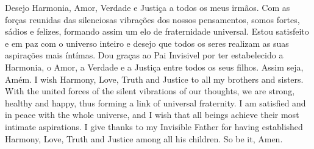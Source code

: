   \beginverse
    Desejo Harmonia, Amor, Verdade e Justiça a todos os
    meus irmãos. Com as forças reunidas das silenciosas
    vibrações dos nossos pensamentos, somos fortes,
    sádios e felizes, formando assim um elo de
    fraternidade universal. Estou satisfeito e em paz
    com o universo inteiro e desejo que todos os seres
    realizam as suas aspirações mais íntímas. Dou graças
    ao Pai Invisivel por ter estabelecido a Harmonia,
    o Amor, a Verdade e a Justiça entre todos os seus
    filhos.
    \parspace
    Assim seja, Amém.
  \endverse
  \beginverse
    I wish Harmony, Love, Truth and Justice to all my
    brothers and sisters. With the united forces of the
    silent vibrations of our thoughts, we are strong,
    healthy and happy, thus forming a link of universal
    fraternity. I am satisfied and in peace with the
    whole universe, and I wish that all beings achieve
    their most intimate aspirations. I give thanks to
    my Invisible Father for having established Harmony,
    Love, Truth and Justice among all his children.
    \parspace
    So be it, Amen.
  \endverse
\endsong


